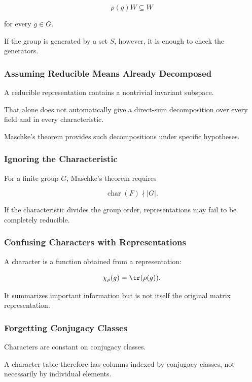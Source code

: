 \[ \rho(g)W\subseteq W \]

for every \(g\in G\).

If the group is generated by a set \(S\), however, it is enough to check the
generators.

\subsubsection{Assuming Reducible Means Already Decomposed}

A reducible representation contains a nontrivial invariant subspace.

That alone does not automatically give a direct-sum decomposition over every
field and in every characteristic.

Maschke's theorem provides such decompositions under specific hypotheses.

\subsubsection{Ignoring the Characteristic}

For a finite group \(G\), Maschke's theorem requires

\[ \operatorname{char}(F)\nmid|G|. \]

If the characteristic divides the group order, representations may fail to
be completely reducible.

\subsubsection{Confusing Characters with Representations}

A character is a function obtained from a representation:

\[ \chi_\rho(g)=\tr(\rho(g)). \]

It summarizes important information but is not itself the original matrix
representation.

\subsubsection{Forgetting Conjugacy Classes}

Characters are constant on conjugacy classes.

A character table therefore has columns indexed by conjugacy classes, not
necessarily by individual elements.

